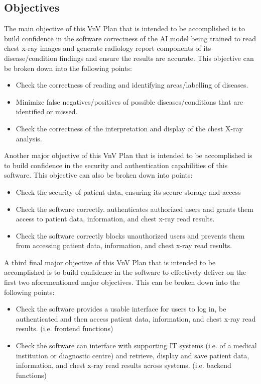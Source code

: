 \documentclass[12pt, titlepage]{article}
\begin{document}
\subsection{Objectives}
The main objective of this VnV Plan that is intended to be accomplished is to build confidence in the software correctness of the AI model being trained to read chest x-ray images and generate radiology report components of its disease/condition findings and ensure the results are accurate. This objective can be broken down into the following points:
\begin{itemize}
    \item Check the correctness of reading and identifying areas/labelling of diseases.
    \item Minimize false negatives/positives of possible diseases/conditions that are identified or missed.
    \item Check the correctness of the interpretation and display of the chest X-ray analysis.
\end{itemize}

\noindent Another major objective of this VnV Plan that is intended to be accomplished is to build confidence in the security and authentication capabilities of this software. This objective can also be broken down into points:
\begin{itemize}
    \item Check the security of patient data, ensuring its secure storage and access
    \item Check the software correctly. authenticates authorized users and grants them access to patient data, information, and chest x-ray read results.
    \item Check the software correctly blocks unauthorized users and prevents them from accessing patient data, information, and chest x-ray read results.
\end{itemize}

\noindent A third final major objective of this VnV Plan that is intended to be accomplished is to build confidence in the software to effectively deliver on the first two aforementioned major objectives. This can be broken down into the following points:
\begin{itemize}
    \item Check the software provides a usable interface for users to log in, be authenticated and then access patient data, information, and chest x-ray read results. (i.e. frontend functions)
    \item Check the software can interface with supporting IT systems (i.e. of a medical institution or diagnostic centre) and retrieve, display and save patient data, information, and chest x-ray read results across systems. (i.e. backend functions)
\end{itemize}
\end{document}
